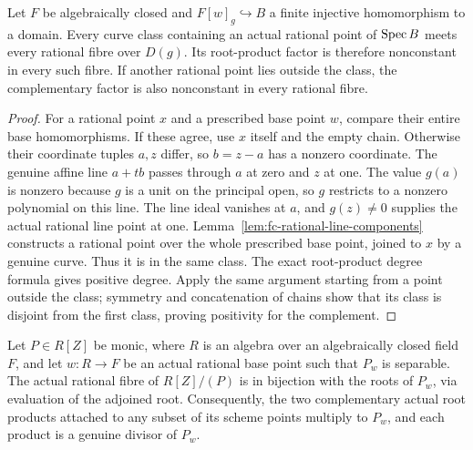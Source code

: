 \begin{lemma}\label{lem:fc-classes-meet-fibres}
\leanok
{}
Let $F$ be algebraically closed and $F[w]_g\hookrightarrow B$ a finite injective homomorphism to a domain.
Every curve class containing an actual rational point of $\operatorname{Spec} B$ meets every rational fibre over $D(g)$.
Its root-product factor is therefore nonconstant in every such fibre. If another rational point lies outside
the class, the complementary factor is also nonconstant in every rational fibre.
\end{lemma}

\begin{proof}
For a rational point $x$ and a prescribed base point $w$, compare their entire base homomorphisms.
If these agree, use $x$ itself and the empty chain. Otherwise their coordinate tuples $a,z$ differ, so
$b=z-a$ has a nonzero coordinate. The genuine affine line $a+tb$ passes through $a$ at zero and $z$ at one.
The value $g(a)$ is nonzero because $g$ is a unit on the principal open, so $g$ restricts to a nonzero polynomial
on this line. The line ideal vanishes at $a$, and $g(z)\ne0$ supplies the actual rational line point at one.
Lemma~\ref{lem:fc-rational-line-components} constructs a rational point over the whole prescribed base point,
joined to $x$ by a genuine curve. Thus it is in the same class. The exact root-product degree formula gives
positive degree. Apply the same argument starting from a point outside the class; symmetry and concatenation
of chains show that its class is disjoint from the first class, proving positivity for the complement.
\end{proof}

\begin{lemma}\label{lem:fc-monogenic-fibre-factors}
\leanok
{}
Let $P\in R[Z]$ be monic, where $R$ is an algebra over an algebraically closed field $F$, and let
$w\colon R\to F$ be an actual rational base point such that $P_w$ is separable.
The actual rational fibre of $R[Z]/(P)$ is in bijection with the roots of $P_w$, via evaluation of the adjoined root.
Consequently, the two complementary actual root products attached to any subset of its scheme points multiply
to $P_w$, and each product is a genuine divisor of $P_w$.
\end{lemma}

